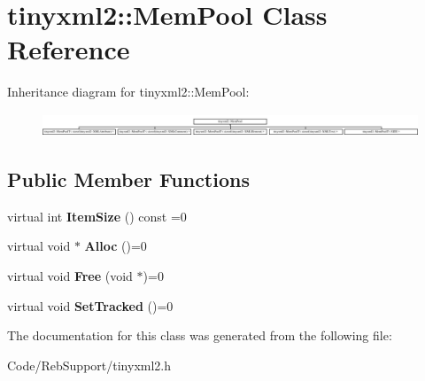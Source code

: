 \hypertarget{classtinyxml2_1_1_mem_pool}{}\section{tinyxml2\+:\+:Mem\+Pool Class Reference}
\label{classtinyxml2_1_1_mem_pool}
Inheritance diagram for tinyxml2\+:\+:Mem\+Pool\+:\begin{figure}[H]
\begin{center}
\leavevmode
\includegraphics[height=0.691358cm]{classtinyxml2_1_1_mem_pool}
\end{center}
\end{figure}
\subsection*{Public Member Functions}
\begin{DoxyCompactItemize}
\item 
virtual int {\bfseries Item\+Size} () const  =0\hypertarget{classtinyxml2_1_1_mem_pool_afb3d8c6cbe91b44f90043d0d94dc7306}{}\label{classtinyxml2_1_1_mem_pool_afb3d8c6cbe91b44f90043d0d94dc7306}

\item 
virtual void $\ast$ {\bfseries Alloc} ()=0\hypertarget{classtinyxml2_1_1_mem_pool_a4f977b5fed752c0bbfe5295f469d6449}{}\label{classtinyxml2_1_1_mem_pool_a4f977b5fed752c0bbfe5295f469d6449}

\item 
virtual void {\bfseries Free} (void $\ast$)=0\hypertarget{classtinyxml2_1_1_mem_pool_a49e3bfac2cba2ebd6776b31e571f64f7}{}\label{classtinyxml2_1_1_mem_pool_a49e3bfac2cba2ebd6776b31e571f64f7}

\item 
virtual void {\bfseries Set\+Tracked} ()=0\hypertarget{classtinyxml2_1_1_mem_pool_ac5804dd1387b2e4de5eef710076a0db1}{}\label{classtinyxml2_1_1_mem_pool_ac5804dd1387b2e4de5eef710076a0db1}

\end{DoxyCompactItemize}


The documentation for this class was generated from the following file\+:\begin{DoxyCompactItemize}
\item 
Code/\+Reb\+Support/tinyxml2.\+h\end{DoxyCompactItemize}
